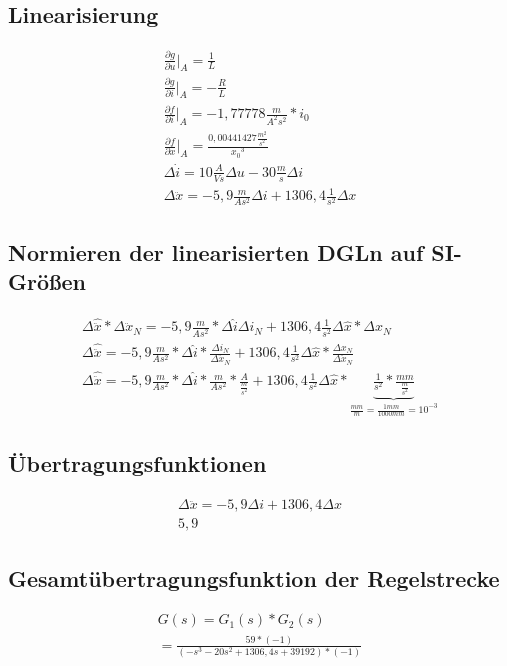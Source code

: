 \documentclass[10pt,a4paper]{article}
\begin{document}
\subsection{Linearisierung}
\begin{figure}[H]
  \begin{align}
	  \frac{\partial g}{\partial u} \Big|_A = \frac{1}{L} \nonumber \\
	  \frac{\partial g}{\partial i} \Big|_A = -\frac{R}{L} \nonumber \\
	  \frac{\partial f}{\partial i} \Big|_A = -1,77778\frac{m}{A^2s^2} * i_0 \nonumber \\
	  \frac{\partial f}{\partial x} \Big|_A = \frac{0,00441427\frac{m^2}{s^2}}{{x_0}^3} \nonumber \\
	  \Delta \dot{i} = 10\frac{A}{Vs}\Delta u - 30 \frac{m}{s} \Delta i \nonumber \\
	  \Delta \ddot{x} = -5,9\frac{m}{As^2} \Delta i + 1306,4 \frac{1}{s^2} \Delta x \nonumber
  \end{align}
\end{figure}


\subsection{Normieren der linearisierten DGLn auf SI-Größen}
\begin{figure}[H]
  \begin{align}
	\Delta \hat{\ddot{x}} * \Delta \ddot{x}_N = -5,9\frac{m}{As^2} * \Delta \hat{i} \Delta i_N + 1306,4 \frac{1}{s^2} \Delta \hat{x} * \Delta x_N \nonumber \\
	\Delta \hat{\ddot{x}} = -5,9\frac{m}{As^2} * \Delta \hat{i} * \frac{\Delta i_N}{\Delta \ddot{x}_N} + 1306,4 \frac{1}{s^2} \Delta \hat{x} * \frac{\Delta x_N}{\Delta \ddot{x}_N} \nonumber \\
	\Delta \hat{\ddot{x}} = -5,9\frac{m}{As^2} * \Delta \hat{i} * \frac{m}{As^2} * \frac{A}{\frac{m}{s^2}} + 1306,4 \frac{1}{s^2} \Delta \hat{x} * \underbrace{\frac{1}{s^2} * \frac{mm}{\frac{m}{s^2}}}_\text{$\frac{mm}{m} = \frac{1mm}{1000mm} = 10^{-3}$} \nonumber
  \end{align}
\end{figure}


\subsection{Übertragungsfunktionen}
\begin{figure}[H]
  \begin{align}
	  \Delta\ddot{x} = -5,9\Delta i + 1306,4 \Delta x \nonumber \\
	  5,9
  \end{align}
\end{figure}



\subsection{Gesamtübertragungsfunktion der Regelstrecke}
\begin{figure}[H]
  \begin{align}
	  G(s) = G_1(s) * G_2(s) \nonumber \\
	  = \frac{59 * (-1)}{(-s^3 -20s^2 + 1306,4s + 39192) * (-1)} \nonumber
  \end{align}
\end{figure}
\end{document}
